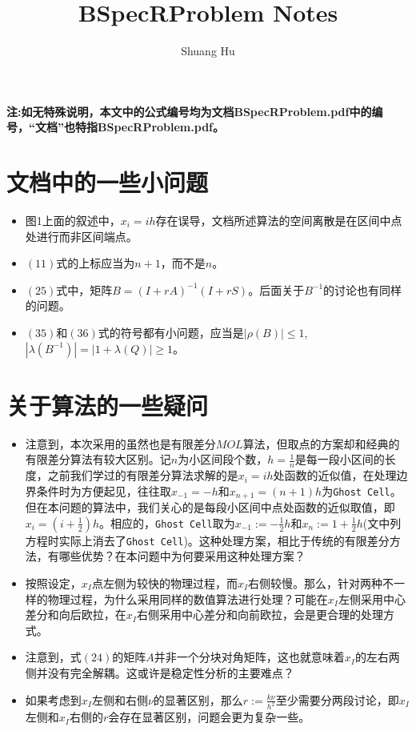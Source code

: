 \documentclass[UTF8]{ctexart}
\title{BSpecRProblem Notes}
\author{Shuang Hu}
\theoremstyle{plain}
\theoremstyle{definition}
\theoremstyle{remark}
\begin{document}
\maketitle
\textbf{注:如无特殊说明，本文中的公式编号均为文档BSpecRProblem.pdf中的编号，“文档”也特指BSpecRProblem.pdf。}
\section{文档中的一些小问题}
\begin{itemize}
    \item 图1上面的叙述中，$x_{i}=ih$存在误导，文档所述算法的空间离散是在区间中点处进行而非区间端点。
    \item $(11)$式的上标应当为$n+1$，而不是$n$。
    \item $(25)$式中，矩阵$B=(I+rA)^{-1}(I+rS)$。后面关于$B^{-1}$的讨论也有同样的问题。
    \item $(35)$和$(36)$式的符号都有小问题，应当是$|\rho(B)|\le 1$, $|\lambda(B^{-1})|=|1+\lambda(Q)|\ge 1$。
\end{itemize}
\section{关于算法的一些疑问}
\begin{itemize}
    \item 注意到，本次采用的虽然也是有限差分$MOL$算法，但取点的方案却和经典的有限差分算法有较大区别。记$n$为小区间段个数，$h=\frac{1}{n}$是每一段小区间的长度，之前我们学过的有限差分算法求解的是$x_{i}=ih$处函数的近似值，在处理边界条件时为方便起见，往往取$x_{-1}=-h$和$x_{n+1}=(n+1)h$为\texttt{Ghost Cell}。但在本问题的算法中，我们关心的是每段小区间中点处函数的近似取值，即$x_{i}=(i+\frac{1}{2})h$。相应的，\texttt{Ghost Cell}取为$x_{-1}:=-\frac{1}{2}h$和$x_{n}:=1+\frac{1}{2}h$(文中列方程时实际上消去了\texttt{Ghost Cell})。这种处理方案，相比于传统的有限差分方法，有哪些优势？在本问题中为何要采用这种处理方案？
    \item 按照设定，$x_{I}$点左侧为较快的物理过程，而$x_{I}$右侧较慢。那么，针对两种不一样的物理过程，为什么采用同样的数值算法进行处理？可能在$x_{I}$左侧采用中心差分和向后欧拉，在$x_{I}$右侧采用中心差分和向前欧拉，会是更合理的处理方式。
    \item 注意到，式$(24)$的矩阵$A$并非一个分块对角矩阵，这也就意味着$x_{I}$的左右两侧并没有完全解耦。这或许是稳定性分析的主要难点？
    \item 如果考虑到$x_{I}$左侧和右侧$\nu$的显著区别，那么$r:=\frac{k\nu}{h^2}$至少需要分两段讨论，即$x_{I}$左侧和$x_{I}$右侧的$r$会存在显著区别，问题会更为复杂一些。
\end{itemize}
\end{document}
